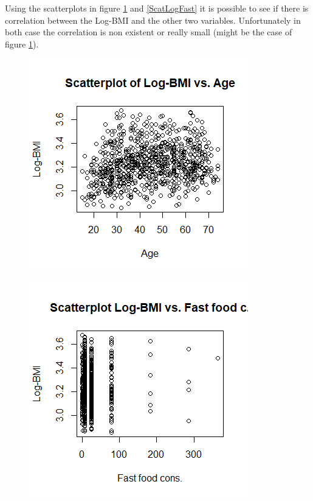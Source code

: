 \newpage
Using the scatterplots in figure \ref{ScatLogAge} and \ref{ScatLogFast} it is possible to see if there is correlation between the Log-BMI and the other two variables. Unfortunately in both case the correlation is non existent or really small (might be the case of figure \ref{ScatLogAge}). \\
\begin{figure}[ht!]
\centering
\begin{minipage}{.5\textwidth}
  \centering
  \includegraphics[width=1\linewidth]{root/Scat_log_age.png}
  \label{ScatLogAge}
\end{minipage}%
\begin{minipage}{.5\textwidth}
  \centering
  \includegraphics[width=1\linewidth]{root/Scat_log_fast.png}

\end{minipage}
\end{figure}
